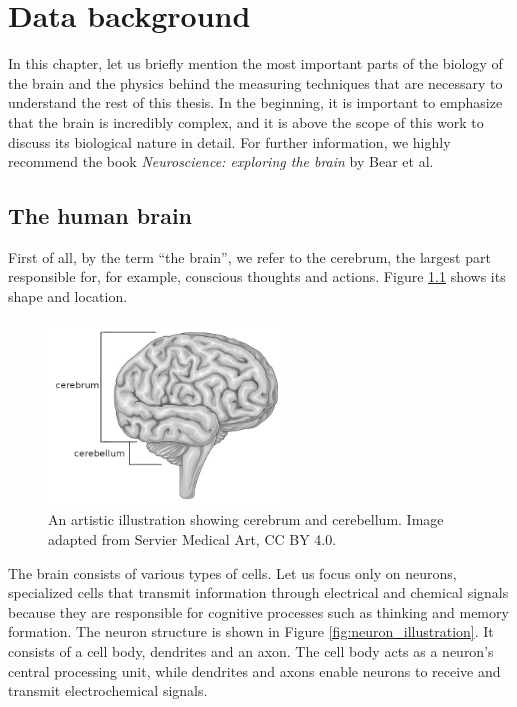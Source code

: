 \chapter{Data background}\label{brain}

In this chapter, let us briefly mention the most important parts of the biology of the brain and the physics behind the measuring techniques that are necessary to understand the rest of this thesis. In the beginning, it is important to emphasize that the brain is incredibly complex, and it is above the scope of this work to discuss its biological nature in detail. For further information, we highly recommend the book \textit{Neuroscience: exploring the brain} by Bear et al. \cite{bear_neuroscience_2016}

\section{The human brain}

First of all, by the term \enquote{the brain}, we refer to the cerebrum, the largest part responsible for, for example, conscious thoughts and actions. Figure \ref{fig:brain_cerebrum_illustration} shows its shape and location.

\begin{figure}
  \begin{center}
    \includegraphics[width=6.3cm]{images/manually_created/brain/brain_cerebrum_cerebellum_II.png}
  \end{center}
  \caption[An artistic illustration showing cerebrum and cerebellum]{An artistic illustration showing cerebrum and cerebellum. Image adapted from Servier Medical Art, CC BY 4.0.}
  \label{fig:brain_cerebrum_illustration}
\end{figure}

The brain consists of various types of cells. Let us focus only on neurons, specialized cells that transmit information through electrical and chemical signals because they are responsible for cognitive processes such as thinking and memory formation. The neuron structure is shown in Figure \ref{fig:neuron_illustration}. It consists of a cell body, dendrites and an axon. The cell body acts as a neuron's central processing unit, while dendrites and axons enable neurons to receive and transmit electrochemical signals. 

